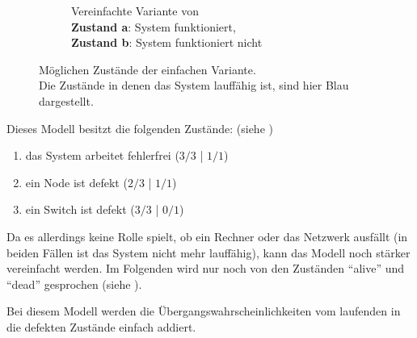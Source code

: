 \documentclass[
            a4paper
            ]{scrartcl}%
\begin{document}
\begin{figure}
\begin{subfigure}[b]{0.48\linewidth}
            \caption{Vereinfachte Variante von  \\
                \textbf{Zustand a}: System funktioniert, \\
                \textbf{Zustand b}: System funktioniert nicht}
            \label{fig:states_simple_mttf_simply}
    \end{subfigure}
    \caption{Möglichen Zustände der einfachen Variante.\\
        Die Zustände in denen das System lauffähig ist, sind hier Blau dargestellt.}
    \label{fig:states_simple_mttf_comb}
\end{figure}

Dieses Modell besitzt die folgenden Zustände: (siehe )
\begin{enumerate}[\bfseries a.]
    \item das System arbeitet fehlerfrei ($3/3$ | $1/1$)
    \item ein Node ist defekt ($2/3$ | $1/1$)
    \item ein Switch ist defekt ($3/3$ | $0/1$)
\end{enumerate}

Da es allerdings keine Rolle spielt, ob ein Rechner oder das Netzwerk ausfällt
(in beiden Fällen ist das System nicht mehr lauffähig), kann das
Modell noch stärker vereinfacht werden. 
Im Folgenden wird nur noch von den Zuständen \enquote{alive} und \enquote{dead} gesprochen 
(siehe ).

Bei diesem Modell werden die Übergangswahrscheinlichkeiten vom laufenden in die
defekten Zustände einfach addiert.
\end{document}
